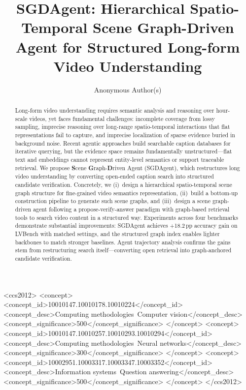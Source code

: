 \documentclass[sigconf, screen, review, anonymous]{acmart}
\begin{document}

\title{SGDAgent: Hierarchical Spatio-Temporal Scene Graph-Driven Agent for Structured Long-form Video Understanding}

\author{Anonymous Author(s)}

\renewcommand{\shortauthors}{Anonymous}

\begin{abstract}

Long-form video understanding requires semantic analysis and reasoning over hour-scale videos, yet faces fundamental challenges: incomplete coverage from lossy sampling, imprecise reasoning over long-range spatio-temporal interactions that flat representations fail to capture, and imprecise localization of sparse evidence buried in background noise. Recent agentic approaches build searchable caption databases for iterative querying, but the evidence space remains fundamentally unstructured—flat text and embeddings cannot represent entity-level semantics or support traceable retrieval.
We propose \textbf{S}cene \textbf{G}raph-\textbf{D}riven Agent (SGDAgent), which restructures long video understanding by converting open-ended caption search into structured candidate verification. Concretely, we (i)~design a hierarchical spatio-temporal scene graph structure for fine-grained video semantics representation, (ii)~build a bottom-up construction pipeline to generate such scene graphs, and (iii)~design a scene graph-driven agent following a propose-verify-answer paradigm with graph-based retrieval tools to search video content in a structured way.
Experiments across four benchmarks demonstrate substantial improvements: SGDAgent achieves +18.2\,pp accuracy gain on LVBench with matched settings, and the structured graph index enables lighter backbones to match stronger baselines. Agent trajectory analysis confirms the gains stem from restructuring search itself—converting open retrieval into graph-anchored candidate verification.
\end{abstract}

\begin{CCSXML}
<ccs2012>
 <concept>
  <concept_id>10010147.10010178.10010224</concept_id>
  <concept_desc>Computing methodologies~Computer vision</concept_desc>
  <concept_significance>500</concept_significance>
 </concept>
 <concept>
  <concept_id>10010147.10010257.10010293.10010294</concept_id>
  <concept_desc>Computing methodologies~Neural networks</concept_desc>
  <concept_significance>300</concept_significance>
 </concept>
 <concept>
  <concept_id>10002951.10003317.10003347.10003352</concept_id>
  <concept_desc>Information systems~Question answering</concept_desc>
  <concept_significance>500</concept_significance>
 </concept>
</ccs2012>
\end{CCSXML}
\end{document}
